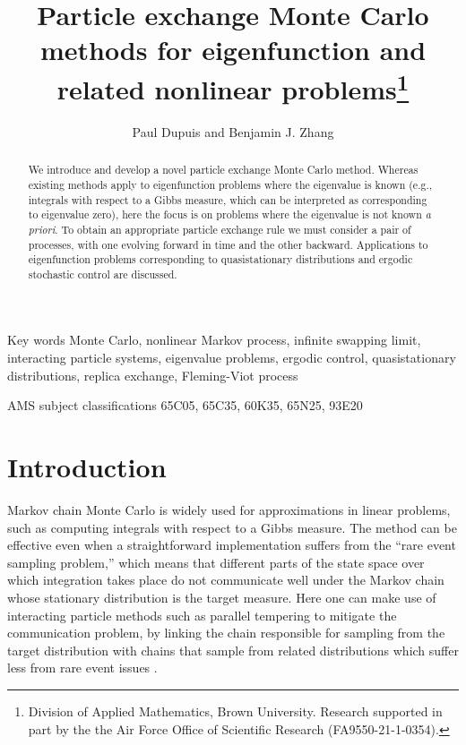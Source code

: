 \documentclass[english,11pt]{article}%
\makeatletter
\newcommand\keywordsname{Key words}
\newcommand\AMSname{AMS subject classifications}
\newenvironment{@abssec}[1]{%
     \if@twocolumn
       \section*{#1}%
     \else
       \vspace{.05in}\footnotesize
       \parindent .0in
         {\upshape\bfseries #1. }\ignorespaces
     \fi}
     {\if@twocolumn\else\par\vspace{.1in}\fi}
\newenvironment{keywords}{\begin{@abssec}{\keywordsname}}{\end{@abssec}}
\newenvironment{AMS}{\begin{@abssec}{\AMSname}}{\end{@abssec}}
\numberwithin{equation}{section}
\numberwithin{example}{section}
\numberwithin{theorem}{section}
\makeatother
\begin{document}
\title{Particle exchange Monte Carlo methods for eigenfunction and related nonlinear problems\thanks{Division of Applied Mathematics, Brown University. Research supported
in part by the the Air Force Office of Scientific Research
(FA9550-21-1-0354).}}
\author{Paul Dupuis and Benjamin J. Zhang}
\maketitle

\begin{abstract}
We introduce and develop a novel particle exchange Monte Carlo method.
Whereas existing methods apply to eigenfunction problems where the eigenvalue is known
(e.g., integrals with respect to a Gibbs measure, which can be interpreted 
as corresponding to eigenvalue zero),
here the focus is on problems where the eigenvalue is not known \emph{a priori}.
To obtain an appropriate particle exchange rule we must consider a pair of processes,
with one evolving forward in time and the other backward.
Applications to eigenfunction problems corresponding to quasistationary distributions and ergodic stochastic control are discussed.
\end{abstract}


\begin{keywords} Monte Carlo, nonlinear Markov process, infinite swapping limit, interacting particle systems, eigenvalue problems, ergodic control, quasistationary distributions, replica exchange, Fleming-Viot process\end{keywords}

\begin{AMS}
    65C05, 65C35, 60K35, 65N25, 93E20
\end{AMS}

\section{Introduction}

Markov chain Monte Carlo is widely used for approximations in linear problems,
such as computing integrals with respect to a Gibbs measure. The method can be
effective even when a straightforward implementation suffers from the ``rare
event sampling problem,'' which means that different parts of the state space
over which integration takes place do not communicate well under the Markov
chain whose stationary distribution is the target measure. 
Here one can
make use of interacting particle methods such as parallel tempering to
mitigate the communication problem, by linking the chain responsible for
sampling from the target distribution with chains that sample from related
distributions which suffer less from rare event issues \cite{gey,swewan}.
\end{document}
